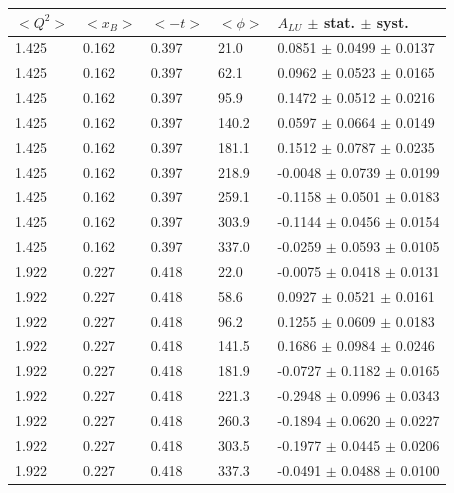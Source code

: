 \begin{table}[!h]
   \begin{center}
      \begin{tabular}{||l|l|l|l|l||}
         \hline
 $<Q^{2}>$ & $<x_{B}>$ & $<-t>$ & $<\phi>$ & $A_{LU}$ $\pm$ stat. $\pm$ syst.\\
         \hline
  1.425 & 0.162 & 0.397 & 21.0  &  0.0851   $\pm$   0.0499   $\pm$   0.0137  \\
  1.425 & 0.162 & 0.397 & 62.1  &  0.0962   $\pm$   0.0523   $\pm$   0.0165  \\
  1.425 & 0.162 & 0.397 & 95.9  &  0.1472   $\pm$   0.0512   $\pm$   0.0216  \\
  1.425 & 0.162 & 0.397 & 140.2 &  0.0597   $\pm$   0.0664   $\pm$   0.0149  \\
  1.425 & 0.162 & 0.397 & 181.1 &  0.1512   $\pm$   0.0787   $\pm$   0.0235  \\
  1.425 & 0.162 & 0.397 & 218.9 & -0.0048   $\pm$   0.0739   $\pm$   0.0199  \\
  1.425 & 0.162 & 0.397 & 259.1 & -0.1158   $\pm$   0.0501   $\pm$   0.0183  \\
  1.425 & 0.162 & 0.397 & 303.9 & -0.1144   $\pm$   0.0456   $\pm$   0.0154  \\
  1.425 & 0.162 & 0.397 & 337.0 & -0.0259   $\pm$   0.0593   $\pm$   0.0105  \\
  \hline                                                                       
  1.922 & 0.227 & 0.418 & 22.0  & -0.0075   $\pm$   0.0418   $\pm$   0.0131  \\
  1.922 & 0.227 & 0.418 & 58.6  &  0.0927   $\pm$   0.0521   $\pm$   0.0161  \\
  1.922 & 0.227 & 0.418 & 96.2  &  0.1255   $\pm$   0.0609   $\pm$   0.0183  \\
  1.922 & 0.227 & 0.418 & 141.5 &  0.1686   $\pm$   0.0984   $\pm$   0.0246  \\
  1.922 & 0.227 & 0.418 & 181.9 & -0.0727   $\pm$   0.1182   $\pm$   0.0165  \\
  1.922 & 0.227 & 0.418 & 221.3 & -0.2948   $\pm$   0.0996   $\pm$   0.0343  \\
  1.922 & 0.227 & 0.418 & 260.3 & -0.1894   $\pm$   0.0620   $\pm$   0.0227  \\
  1.922 & 0.227 & 0.418 & 303.5 & -0.1977   $\pm$   0.0445   $\pm$   0.0206  \\
  1.922 & 0.227 & 0.418 & 337.3 & -0.0491   $\pm$   0.0488   $\pm$   0.0100  \\
  \hline                                                                       

\end{tabular}
\end{center}
\end{table}

